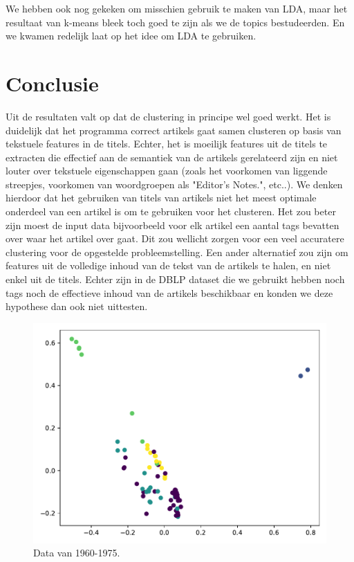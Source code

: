 \documentclass[a4paper,fontsize=11pt]{article}
\begin{document}
We hebben ook nog gekeken om misschien gebruik te maken van LDA, maar het resultaat van k-means bleek toch goed te zijn als we de topics bestudeerden. En we kwamen redelijk laat op het idee om LDA te gebruiken. 



\section{Conclusie}
Uit de resultaten valt op dat de clustering in principe wel goed werkt.
Het is duidelijk dat het programma correct artikels gaat samen clusteren op basis van tekstuele features in de titels.
Echter, het is moeilijk features uit de titels te extracten die effectief aan de semantiek van de artikels gerelateerd zijn en niet louter over tekstuele eigenschappen gaan (zoals het voorkomen van liggende streepjes, voorkomen van woordgroepen als "Editor's Notes.", etc..).
We denken hierdoor dat het gebruiken van titels van artikels niet het meest optimale onderdeel van een artikel is om te gebruiken voor het clusteren.
Het zou beter zijn moest de input data bijvoorbeeld voor elk artikel een aantal tags bevatten over waar het artikel over gaat.
Dit zou wellicht zorgen voor een veel accuratere clustering voor de opgestelde probleemstelling. Een ander alternatief zou zijn om features uit de volledige inhoud van de tekst van de artikels te halen, en niet enkel uit de titels.
Echter zijn in de DBLP dataset die we gebruikt hebben noch tags noch de effectieve inhoud van de artikels beschikbaar en konden we deze hypothese dan ook niet uittesten. 

\begin{figure}[H]
  \centering
  \includegraphics[width=\textwidth]{pca_1960-1975.pdf}
  \caption{Data van 1960-1975.}
  \label{fig:1960}
\end{figure}
\end{document}
